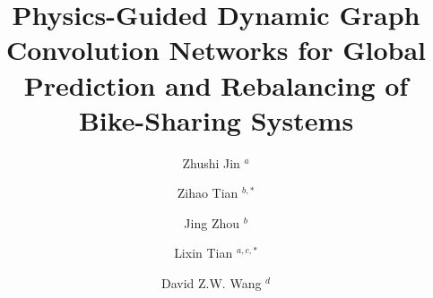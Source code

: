 \documentclass[preprint,12pt,authoryear]{elsarticle}
\begin{document}
\begin{frontmatter}






\title{Physics-Guided Dynamic Graph Convolution Networks for Global Prediction and Rebalancing of Bike-Sharing Systems\\} %

\author{Zhushi Jin $^{a}$}
\author{Zihao Tian $^{b,*}$ }
\author{Jing Zhou $^{b}$}
\author{Lixin Tian $^{a,c,*}$ }
\author{David Z.W. Wang $^{d}$}

\address[a]{Institute of Carbon Neutrality Development, School of Mathematical Sciences, Jiangsu University, Zhenjiang, Jiangsu, 212013, China}
\address[b]{School of Management and Engineering, Nanjing University, Nanjing, Jiangsu, 210093, China}
\address[c]{Jiangsu Province Engineering Research Center of Spatial Big Data, School of Mathematical Sciences, Nanjing Normal University, Nanjing, Jiangsu 210023, China}
\address[d]{School of Civil and Environmental Engineering, Nanyang Technological University, Singapore}



\end{frontmatter}
\end{document}
